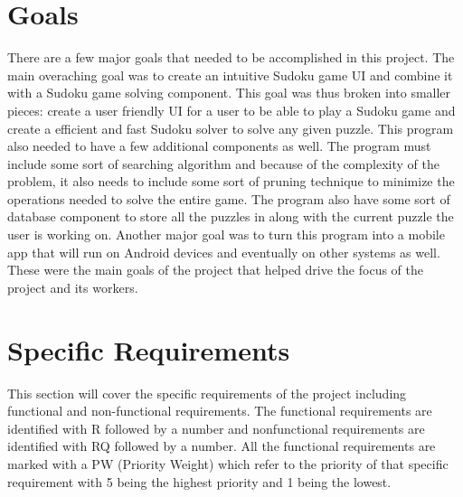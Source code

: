 \documentclass{article}
\begin{document}
 

\section{Goals}
There are a few major goals that needed to be accomplished in this project. The main overaching goal was to create an intuitive Sudoku game UI and combine it with a Sudoku game solving component. This goal was thus broken into smaller pieces: create a user friendly UI for a user to be able to play a Sudoku game and create a efficient and fast Sudoku solver to solve any given puzzle. This program also needed to have a few additional components as well. The program must include some sort of searching algorithm and because of the complexity of the problem, it also needs to include some sort of pruning technique to minimize the operations needed to solve the entire game. The program also have some sort of database component to store all the puzzles in along with the current puzzle the user is working on. Another major goal was to turn this program into a mobile app that will run on Android devices and eventually on other systems as well. These were the main goals of the project that helped drive the focus of the project and its workers.

 
\section{Specific Requirements}
This section will cover the specific requirements of the project including functional and non-functional requirements. The functional requirements are identified with R followed by a number and nonfunctional requirements are identified with RQ followed by a number. All the functional requirements are marked with a PW (Priority Weight) which refer to the priority of that specific requirement with 5 being the highest priority and 1 being the lowest.

 
\end{document}
